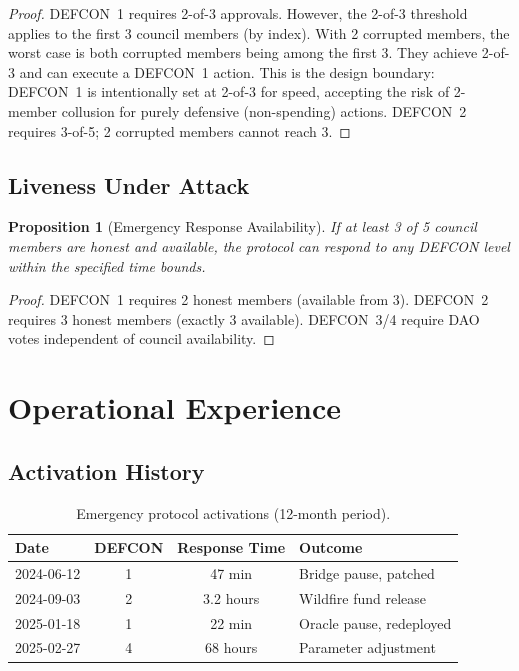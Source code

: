 \documentclass[11pt,letterpaper]{article}
\newtheorem{proposition}[theorem]{Proposition}
\begin{document}
\begin{proof}
DEFCON~1 requires 2-of-3 approvals. However, the 2-of-3 threshold applies to the first 3 council members (by index). With 2 corrupted members, the worst case is both corrupted members being among the first 3. They achieve 2-of-3 and can execute a DEFCON~1 action. This is the design boundary: DEFCON~1 is intentionally set at 2-of-3 for speed, accepting the risk of 2-member collusion for purely defensive (non-spending) actions. DEFCON~2 requires 3-of-5; 2 corrupted members cannot reach 3.
\end{proof}

\subsection{Liveness Under Attack}

\begin{proposition}[Emergency Response Availability]
If at least 3 of 5 council members are honest and available, the protocol can respond to any DEFCON level within the specified time bounds.
\end{proposition}

\begin{proof}
DEFCON~1 requires 2 honest members (available from 3). DEFCON~2 requires 3 honest members (exactly 3 available). DEFCON~3/4 require DAO votes independent of council availability.
\end{proof}

\section{Operational Experience}
\label{sec:operations}

\subsection{Activation History}

\begin{table}[h]
\centering
\caption{Emergency protocol activations (12-month period).}
\label{tab:activations}
\begin{tabular}{lccl}
\toprule
\textbf{Date} & \textbf{DEFCON} & \textbf{Response Time} & \textbf{Outcome} \\
\midrule
2024-06-12 & 1 & 47 min & Bridge pause, patched \\
2024-09-03 & 2 & 3.2 hours & Wildfire fund release \\
2025-01-18 & 1 & 22 min & Oracle pause, redeployed \\
2025-02-27 & 4 & 68 hours & Parameter adjustment \\
\bottomrule
\end{tabular}
\end{table}
\end{document}
